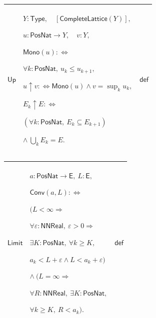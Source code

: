 \documentclass[11pt]{amsart}
\newlength{\FTCThreeColumnBody}
\begin{document}
{\begin{tabular}{|@{}>{\centering\arraybackslash}m{0.251968\FTCThreeColumnBody}|>{\centering\arraybackslash}m{0.590551\FTCThreeColumnBody}|>{\centering\arraybackslash}m{0.157480\FTCThreeColumnBody}|}
\end{tabular}%
\par\setlength{\parskip}{0pt}\nointerlineskip
\noindent
\begin{tabular}{|@{}>{\centering\arraybackslash}m{0.251968\FTCThreeColumnBody}|>{\centering\arraybackslash}m{0.590551\FTCThreeColumnBody}|>{\centering\arraybackslash}m{0.157480\FTCThreeColumnBody}|}\hline
\hypertarget{def:Up}{$\displaystyle \textsf{Up}$} & $\displaystyle Y:\textsf{Type},\quad[\textsf{CompleteLattice}(Y)],$\par
$\displaystyle u:\textsf{PosNat}\to Y,\quad v:Y,$\par
$\displaystyle \textsf{Mono}(u):\Longleftrightarrow$\par
$\displaystyle \forall k:\textsf{PosNat},\ u_k\le u_{k+1},$\par
$\displaystyle u\uparrow v:\Longleftrightarrow\textsf{Mono}(u)\land v=\sup_k u_k,$\par
$\displaystyle E_k\uparrow E:\Longleftrightarrow$\par
$\displaystyle (\forall k:\textsf{PosNat},\ E_k\subseteq E_{k+1})$\par
$\displaystyle \land\ \bigcup_k E_k=E.$ & $\displaystyle \textsf{def}$\\ \hline
\end{tabular}%
\par\setlength{\parskip}{0pt}\nointerlineskip
\noindent
\begin{tabular}{|@{}>{\centering\arraybackslash}m{0.251968\FTCThreeColumnBody}|>{\centering\arraybackslash}m{0.590551\FTCThreeColumnBody}|>{\centering\arraybackslash}m{0.157480\FTCThreeColumnBody}|}\hline
\hypertarget{def:Limit}{$\displaystyle \textsf{Limit}$} & $\displaystyle a:\textsf{PosNat}\to\textsf{E},\ L:\textsf{E},$\par
$\displaystyle \textsf{Conv}(a,L):\Longleftrightarrow$\par
$\displaystyle \bigl(L<\infty\Rightarrow$\par
$\displaystyle \forall\varepsilon:\textsf{NNReal},\ \varepsilon>0\Rightarrow$\par
$\displaystyle \exists K:\textsf{PosNat},\ \forall k\ge K,$\par
$\displaystyle a_k<L+\varepsilon\land L<a_k+\varepsilon\bigr)$\par
$\displaystyle \land\ \bigl(L=\infty\Rightarrow$\par
$\displaystyle \forall R:\textsf{NNReal},\ \exists K:\textsf{PosNat},$\par
$\displaystyle \forall k\ge K,\ R<a_k\bigr).$ & $\displaystyle \textsf{def}$\\ \hline
\end{tabular}%
\par
}
\end{document}
